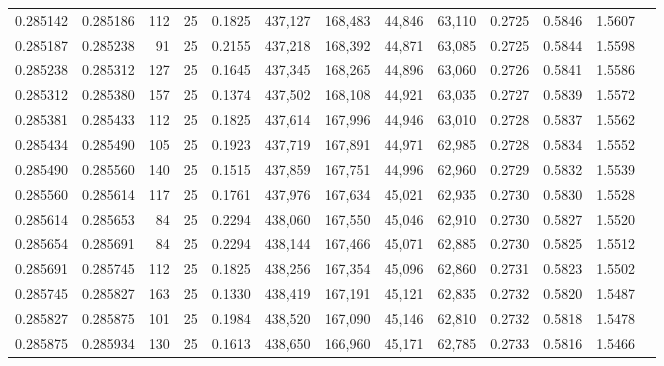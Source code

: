 \begin{tabular}{rrrrrrrrrrrrr}
0.285142 & 0.285186 &   112 &  25 &                                     0.1825 & 437,127 & 168,483 &  44,846 &  63,110 & 0.2725 & 0.5846 & 1.5607 \\
0.285187 & 0.285238 &    91 &  25 &                                     0.2155 & 437,218 & 168,392 &  44,871 &  63,085 & 0.2725 & 0.5844 & 1.5598 \\
0.285238 & 0.285312 &   127 &  25 &                                     0.1645 & 437,345 & 168,265 &  44,896 &  63,060 & 0.2726 & 0.5841 & 1.5586 \\
0.285312 & 0.285380 &   157 &  25 &                                     0.1374 & 437,502 & 168,108 &  44,921 &  63,035 & 0.2727 & 0.5839 & 1.5572 \\
0.285381 & 0.285433 &   112 &  25 &                                     0.1825 & 437,614 & 167,996 &  44,946 &  63,010 & 0.2728 & 0.5837 & 1.5562 \\
0.285434 & 0.285490 &   105 &  25 &                                     0.1923 & 437,719 & 167,891 &  44,971 &  62,985 & 0.2728 & 0.5834 & 1.5552 \\
0.285490 & 0.285560 &   140 &  25 &                                     0.1515 & 437,859 & 167,751 &  44,996 &  62,960 & 0.2729 & 0.5832 & 1.5539 \\
0.285560 & 0.285614 &   117 &  25 &                                     0.1761 & 437,976 & 167,634 &  45,021 &  62,935 & 0.2730 & 0.5830 & 1.5528 \\
0.285614 & 0.285653 &    84 &  25 &                                     0.2294 & 438,060 & 167,550 &  45,046 &  62,910 & 0.2730 & 0.5827 & 1.5520 \\
0.285654 & 0.285691 &    84 &  25 &                                     0.2294 & 438,144 & 167,466 &  45,071 &  62,885 & 0.2730 & 0.5825 & 1.5512 \\
0.285691 & 0.285745 &   112 &  25 &                                     0.1825 & 438,256 & 167,354 &  45,096 &  62,860 & 0.2731 & 0.5823 & 1.5502 \\
0.285745 & 0.285827 &   163 &  25 &                                     0.1330 & 438,419 & 167,191 &  45,121 &  62,835 & 0.2732 & 0.5820 & 1.5487 \\
0.285827 & 0.285875 &   101 &  25 &                                     0.1984 & 438,520 & 167,090 &  45,146 &  62,810 & 0.2732 & 0.5818 & 1.5478 \\
0.285875 & 0.285934 &   130 &  25 &                                     0.1613 & 438,650 & 166,960 &  45,171 &  62,785 & 0.2733 & 0.5816 & 1.5466 \\

\end{tabular}
